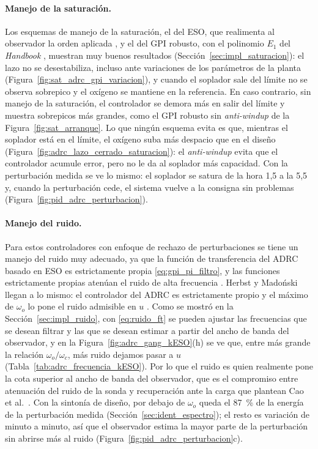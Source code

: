 \paragraph{Manejo de la saturación.} Los esquemas de manejo de la saturación, el del ESO, que
realimenta al observador la orden aplicada \cite[sec.~9.1.1]{herbst2024adrc}, y el del GPI robusto, con el
polinomio $E_1$ del \emph{Handbook} \cite[sec.~19.1.3]{levine2011handbook}, muestran muy buenos
resultados (Sección~\ref{sec:impl_saturacion}): el lazo no se desestabiliza, incluso ante variaciones
de los parámetros de la planta (Figura~\ref{fig:sat_adrc_gpi_variacion}), y cuando el soplador sale del
límite no se observa sobrepico y el oxígeno se mantiene en la referencia. En caso contrario, sin manejo
de la saturación, el controlador se demora más en salir del límite y muestra sobrepicos más grandes,
como el GPI robusto sin \emph{anti-windup} de la Figura~\ref{fig:sat_arranque}. Lo que ningún esquema evita es
que, mientras el soplador está en el límite, el oxígeno suba más despacio que en el diseño
(Figura~\ref{fig:adrc_lazo_cerrado_saturacion}): el \emph{anti-windup} evita que el controlador acumule
error, pero no le da al soplador más capacidad. Con la perturbación medida se ve lo mismo: el
soplador se satura de la hora 1,5 a la 5,5 y, cuando la perturbación cede, el sistema vuelve a la
consigna sin problemas (Figura~\ref{fig:pid_adrc_perturbacion}).

\paragraph{Manejo del ruido.} Para estos controladores con enfoque de rechazo de perturbaciones se
tiene un manejo del ruido muy adecuado, ya que la función de transferencia del ADRC basado en ESO es
estrictamente propia \eqref{eq:gpi_pi_filtro}, y las funciones estrictamente propias atenúan el ruido
de alta frecuencia \cite[pp.~31--32]{chen1993analog}. Herbst y Madoński llegan a lo mismo: el
controlador del ADRC es estrictamente propio y el máximo de $\omega_o$ lo pone el ruido admisible en
$u$ \cite[ecs.~4.20 y 6.30]{herbst2024adrc}. Como se mostró en la Sección~\ref{sec:impl_ruido}, con
\eqref{eq:ruido_ft} se pueden ajustar las frecuencias que se desean filtrar y las que se desean estimar
a partir del ancho de banda del observador, y en la Figura~\ref{fig:adrc_gang_kESO}(h) se ve que, entre
más grande la relación $\omega_o/\omega_c$, más ruido dejamos pasar a $u$
(Tabla~\ref{tab:adrc_frecuencia_kESO}). Por lo que el ruido es quien realmente
pone la cota superior al ancho de banda del observador, que es el compromiso entre atenuación del ruido
de la sonda y recuperación ante la carga que plantean Cao et al.\ \cite{cao2025cascaded}. Con la
sintonía de diseño, por debajo de $\omega_o$ queda el 87~\% de la energía de la perturbación medida
(Sección~\ref{sec:ident_espectro}); el resto es variación de minuto a minuto, así que el observador
estima la mayor parte de la perturbación sin abrirse más al ruido (Figura~\ref{fig:pid_adrc_perturbacion}c).

